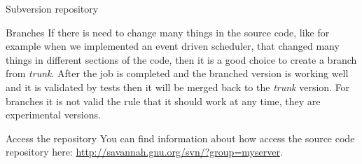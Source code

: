 \documentclass[12pt]{article}
\begin{document}
\begin{section}{Subversion repository}
\begin{subsection}{Branches}
If there is need to change many things in the source code, like for
example when we implemented an event driven scheduler, that changed
many things in different sections of the code, then it is a good
choice to create a branch from \textit{trunk}.
After the job is completed and the branched version is working well
and it is validated by tests then it will be merged back to the
\textit{trunk} version.
For branches it is not valid the rule that it should work at any time,
they are experimental versions.
\end{subsection}

\begin{subsection}{Access the repository}
You can find information about how access the source code repository here:
\url{http://savannah.gnu.org/svn/?group=myserver}.
\end{subsection}
\end{section}
\end{document}
